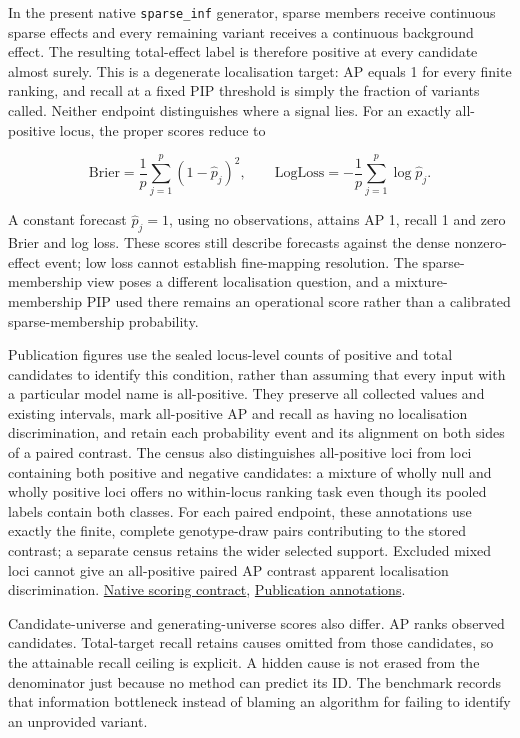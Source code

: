 \documentclass[
  british,
  10pt,
]{article}
\begin{document}
In the present native \texttt{sparse\_inf} generator, sparse members
receive continuous sparse effects and every remaining variant receives a
continuous background effect. The resulting total-effect label is
therefore positive at every candidate almost surely. This is a
degenerate localisation target: AP equals 1 for every finite ranking,
and recall at a fixed PIP threshold is simply the fraction of variants
called. Neither endpoint distinguishes where a signal lies. For an
exactly all-positive locus, the proper scores reduce to

\[\mathrm{Brier}=\frac1p\sum_{j=1}^{p}(1-\widehat p_j)^2,\qquad
\mathrm{LogLoss}=-\frac1p\sum_{j=1}^{p}\log\widehat p_j.\]

A constant forecast \(\widehat p_j=1\), using no observations, attains
AP 1, recall 1 and zero Brier and log loss. These scores still describe
forecasts against the dense nonzero-effect event; low loss cannot
establish fine-mapping resolution. The sparse-membership view poses a
different localisation question, and a mixture-membership PIP used there
remains an operational score rather than a calibrated sparse-membership
probability.

Publication figures use the sealed locus-level counts of positive and
total candidates to identify this condition, rather than assuming that
every input with a particular model name is all-positive. They preserve
all collected values and existing intervals, mark all-positive AP and
recall as having no localisation discrimination, and retain each
probability event and its alignment on both sides of a paired contrast.
The census also distinguishes all-positive loci from loci containing
both positive and negative candidates: a mixture of wholly null and
wholly positive loci offers no within-locus ranking task even though its
pooled labels contain both classes. For each paired endpoint, these
annotations use exactly the finite, complete genotype-draw pairs
contributing to the stored contrast; a separate census retains the wider
selected support. Excluded mixed loci cannot give an all-positive paired
AP contrast apparent localisation discrimination.
\href{../scripts/native/campaign/helpers.R}{Native scoring contract},
\href{native_publication.R}{Publication annotations}.

Candidate-universe and generating-universe scores also differ. AP ranks
observed candidates. Total-target recall retains causes omitted from
those candidates, so the attainable recall ceiling is explicit. A hidden
cause is not erased from the denominator just because no method can
predict its ID. The benchmark records that information bottleneck
instead of blaming an algorithm for failing to identify an unprovided
variant.
\end{document}
